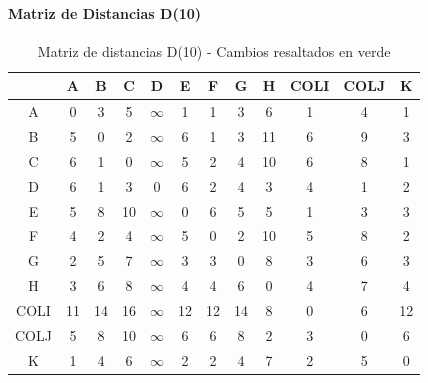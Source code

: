\documentclass[12pt]{article}
\begin{document}
\paragraph{Matriz de Distancias D(10)}
\begin{table}[h!]
\centering
\begin{tabular}{|c|c|c|c|c|c|c|c|c|c|c|c|}
\hline
 & A & B & C & D & E & F & G & H & COLI & COLJ & K \\\hline
A & 0 & 3 & 5 & $\infty$ & 1 & 1 & 3 & \cellcolor{lightgreen} 6 & 1 & 4 & 1 \\\hline
B & 5 & 0 & 2 & $\infty$ & 6 & 1 & 3 & \cellcolor{lightgreen} 11 & 6 & 9 & 3 \\\hline
C & 6 & 1 & 0 & $\infty$ & 5 & 2 & 4 & \cellcolor{lightgreen} 10 & 6 & 8 & 1 \\\hline
D & 6 & 1 & 3 & 0 & 6 & 2 & 4 & \cellcolor{lightgreen} 3 & \cellcolor{lightgreen} 4 & 1 & 2 \\\hline
E & 5 & 8 & 10 & $\infty$ & 0 & 6 & 5 & \cellcolor{lightgreen} 5 & 1 & 3 & 3 \\\hline
F & 4 & 2 & 4 & $\infty$ & 5 & 0 & 2 & \cellcolor{lightgreen} 10 & 5 & 8 & 2 \\\hline
G & 2 & 5 & 7 & $\infty$ & 3 & 3 & 0 & \cellcolor{lightgreen} 8 & 3 & 6 & 3 \\\hline
H & 3 & 6 & 8 & $\infty$ & 4 & 4 & 6 & 0 & 4 & 7 & 4 \\\hline
COLI & \cellcolor{lightgreen} 11 & \cellcolor{lightgreen} 14 & \cellcolor{lightgreen} 16 & $\infty$ & \cellcolor{lightgreen} 12 & \cellcolor{lightgreen} 12 & \cellcolor{lightgreen} 14 & \cellcolor{lightgreen} 8 & 0 & 6 & \cellcolor{lightgreen} 12 \\\hline
COLJ & 5 & 8 & 10 & $\infty$ & 6 & 6 & 8 & 2 & 3 & 0 & 6 \\\hline
K & 1 & 4 & 6 & $\infty$ & 2 & 2 & 4 & \cellcolor{lightgreen} 7 & 2 & 5 & 0 \\\hline
\end{tabular}
\caption{Matriz de distancias D(10) - Cambios resaltados en verde}
\end{table}
\end{document}
